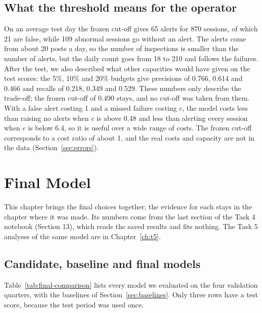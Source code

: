 \documentclass[12pt,a4paper,openany]{report}
\begin{document}
\section{What the threshold means for the operator}\label{sec:t5-threshold}

On an average test day the frozen cut-off gives 65 alerts for 870 sessions, of which 21 are false, while 109
abnormal sessions go without an alert. The alerts come from about 20 posts a day, so the number of inspections is
smaller than the number of alerts, but the daily count goes from 18 to 210 and follows the failures. After the test,
we also described what other capacities would have given on the test scores: the 5\%, 10\% and 20\% budgets give
precisions of 0.766, 0.614 and 0.466 and recalls of 0.218, 0.349 and 0.529. These numbers only describe the
trade-off; the frozen cut-off of 0.490 stays, and no cut-off was taken from them. With a false alert costing 1 and
a missed failure costing $c$, the model costs less than raising no alerts when $c$ is above 0.48 and less than
alerting every session when $c$ is below 6.4, so it is useful over a wide range of costs. The frozen cut-off
corresponds to a cost ratio of about 1, and the real costs and capacity are not in the data
(Section~\ref{sec:errors}).

\chapter{Final Model}\label{ch:final}

This chapter brings the final choices together; the evidence for each stays in the chapter where it was made. Its
numbers come from the last section of the Task 4 notebook (Section 13), which reads the saved results and fits nothing. The
Task 5 analyses of the same model are in Chapter~\ref{ch:t5}.

\section{Candidate, baseline and final models}\label{sec:final-comparison}

Table~\ref{tab:final-comparison} lists every model we evaluated on the four validation quarters, with the baselines
of Section~\ref{sec:baselines}. Only three rows have a test score, because the test period was used once.
\end{document}
